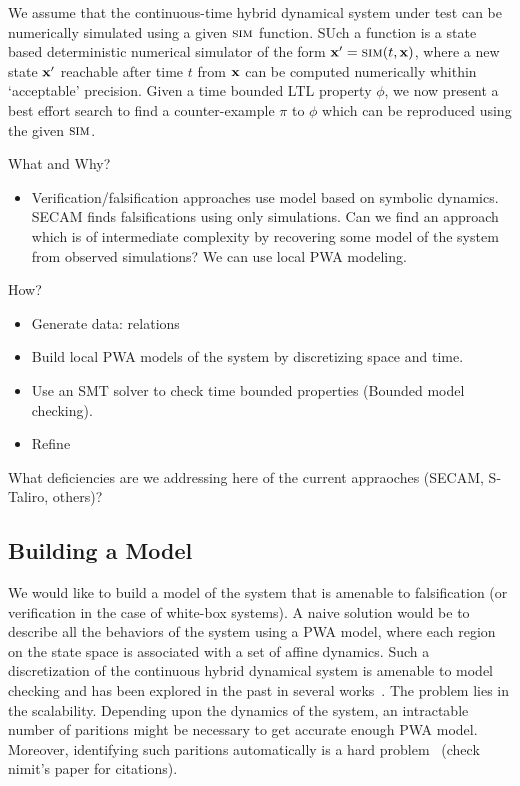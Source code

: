We assume that the continuous-time hybrid dynamical system under test
can be numerically simulated using a given $\mbox{\sc sim}$ function. SUch
a function is a state based deterministic numerical simulator of the
form $\mathbf{x}'=\mbox{\sc sim}(t,\mathbf{x})$, where a new state $\mathbf{x}'$ reachable after
time $t$ from $\mathbf{x}$ can be computed numerically whithin `acceptable'
precision. Given a time bounded LTL property $\phi$, we now present a
best effort search to find a counter-example $\pi$ to $\phi$ which can
be reproduced using the given $\mbox{\sc sim}$.

What and Why?
\begin{itemize}
    \item Verification/falsification approaches use model
        based on symbolic dynamics. SECAM finds falsifications using
        only simulations. Can we find an approach which is of
        intermediate complexity by recovering some model of the system
        from observed simulations? We can use local PWA modeling.
\end{itemize}

How?
\begin{itemize}
    \item Generate data: relations
    \item Build local PWA models of the system by discretizing space
          and time.
    \item Use an SMT solver to check time bounded
          properties (Bounded model checking).
    \item Refine
\end{itemize}

What deficiencies are we addressing here of the current
appraoches (SECAM, S-Taliro, others)?

\subsection{Building a Model} We would like to build a model of the
system that is amenable to falsification (or verification in the case
of white-box systems). A naive solution would be to describe all the
behaviors of the system using a PWA model, where each region on the
state space is associated with a set of affine dynamics. Such a
discretization of the continuous hybrid dynamical system is amenable
to model checking and has been explored in the past in several
works~\cite{}. The problem lies in the scalability. Depending upon the
dynamics of the system, an intractable number of paritions might be
necessary to get accurate enough PWA model. Moreover, identifying such
paritions automatically is a hard problem~\cite{} (check nimit's paper
for citations).

